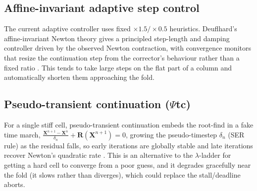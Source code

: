 \documentclass[11pt]{article}
\newcommand{\Res}{\mathbf{R}}
\newcommand{\Xv}{\mathbf{X}}
\begin{document}
\subsection{Affine-invariant adaptive step control}
The current adaptive controller uses fixed $\times1.5/\times0.5$ heuristics.
Deuflhard's affine-invariant Newton theory gives a principled step-length and
damping controller driven by the observed Newton contraction, with convergence
monitors that resize the continuation step from the corrector's behaviour rather
than a fixed ratio \cite{Deuflhard2004}. This tends to take large steps on the
flat part of a column and automatically shorten them approaching the fold.

\subsection{Pseudo-transient continuation ($\Psi$tc)}
For a single stiff cell, pseudo-transient continuation embeds the root-find in a
fake time march, $\frac{\Xv^{n+1}-\Xv^{n}}{\delta_n} + \Res(\Xv^{n+1}) = 0$,
growing the pseudo-timestep $\delta_n$ (SER rule) as the residual falls, so early
iterations are globally stable and late iterations recover Newton's quadratic
rate \cite{KelleyKeyes1998,Kelley2003}. This is an alternative to the
$\lambda$-ladder for getting a hard cell to converge from a poor guess, and it
degrades gracefully near the fold (it slows rather than diverges), which could
replace the stall/deadline aborts.
\end{document}
